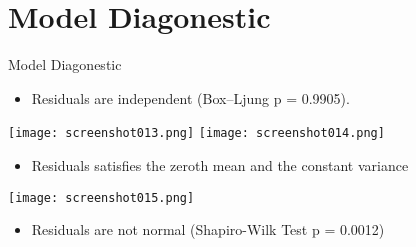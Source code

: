 \documentclass[11pt]{beamer}
\begin{document}
	\section{Model Diagonestic}
	\begin{frame}{Model Diagonestic}
		\begin{itemize}
			\item Residuals are independent (Box–Ljung p = 0.9905).
		\end{itemize}
		\graphicspath{{C:/Users/MSI/OneDrive/Attachments/Pictures/}}
		\centering
		\texttt{[image: screenshot013.png]}%
		\hfill
		\texttt{[image: screenshot014.png]}
		
		\vspace{-0.1cm}
		\begin{itemize}
			\item Residuals satisfies the zeroth mean and the constant variance
		\end{itemize}
	
		\vspace{-0.1cm}
			\graphicspath{{C:/Users/MSI/OneDrive/Attachments/Pictures/}}
		\texttt{[image: screenshot015.png]}
		
		\begin{itemize}
			\item Residuals are not normal (Shapiro-Wilk Test p = 0.0012)
		\end{itemize}
	\end{frame}
	
\end{document}
